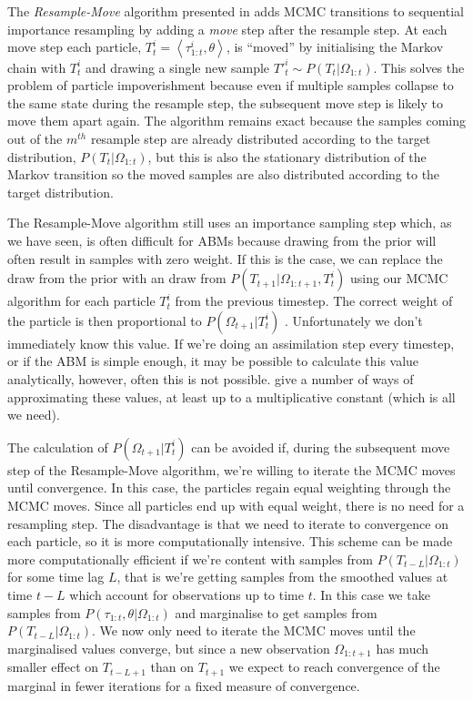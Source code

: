 \documentclass{article}
\begin{document}
The \textit{Resample-Move} algorithm presented in \citet{gilks2001following} adds MCMC transitions to sequential importance resampling by adding a \textit{move} step after the resample step. At each move step each particle, $T^i_t = \left<\tau_{1:t}^i,\theta\right>$, is ``moved'' by initialising the Markov chain with $T^i_t$ and drawing a single new sample $T'^{i}_{t} \sim P(T_t|\Omega_{1:t})$. This solves the problem of particle impoverishment because even if multiple samples collapse to the same state during the resample step, the subsequent move step is likely to move them apart again. The algorithm remains exact because the samples coming out of the $m^{th}$ resample step are already distributed according to the target distribution, $P(T_t|\Omega_{1:t})$, but this is also the stationary distribution of the Markov transition so the moved samples are also distributed according to the target distribution.

The Resample-Move algorithm still uses an importance sampling step which, as we have seen, is often difficult for ABMs because drawing from the prior will often result in samples with zero weight. If this is the case, we can replace the draw from the prior with an draw from $P(T_{t+1}|\Omega_{1:{t+1}},T^i_t)$ using our MCMC algorithm for each particle $T^i_t$ from the previous timestep. The correct weight of the particle is then proportional to $P(\Omega_{t+1}|T^i_t)$ \citep{doucet2009tutorial}. Unfortunately we don't immediately know this value. If we're doing an assimilation step every timestep, or if the ABM is simple enough, it may be possible to calculate this value analytically, however, often this is not possible.   \citet*{han2001markov, newton1994approximate, stefankovic2009adaptive} give a number of ways of approximating these values, at least up to a multiplicative constant (which is all we need).

The calculation of $P(\Omega_{t+1}|T^i_t)$ can be avoided if, during the subsequent move step of the Resample-Move algorithm, we're willing to iterate the MCMC moves until convergence. In this case, the particles regain equal weighting through the MCMC moves. Since all particles end up with equal weight, there is no need for a resampling step. The disadvantage is that we need to iterate to convergence on each particle, so it is more computationally intensive. This scheme can be made more computationally efficient if we're content with samples from $P(T_{t-L}|\Omega_{1:t})$ for some time lag $L$, that is we're getting samples from the smoothed values at time $t-L$ which account for observations up to time $t$. In this case we take samples from $P(\tau_{1:t},\theta|\Omega_{1:t})$ and marginalise to get samples from $P(T_{t-L}|\Omega_{1:t})$. We now only need to iterate the MCMC moves until the marginalised values converge, but since a new observation $\Omega_{1:t+1}$ has much smaller effect on $T_{t-L+1}$ than on $T_{t+1}$ we expect to reach convergence of the marginal in fewer iterations for a fixed measure of convergence.
\end{document}
